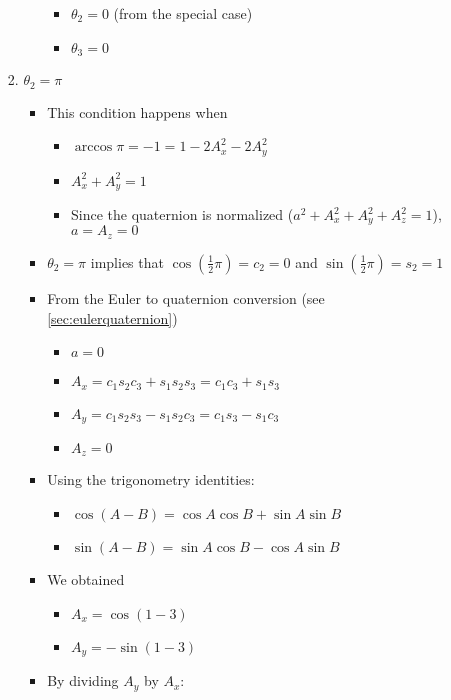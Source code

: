 \documentclass[letterpaper]{article}
\begin{document}
\begin{itemize}
\begin{itemize}
\begin{enumerate}
\begin{itemize}
\begin{itemize}
										\item $\theta_2 = 0$ (from the special case)
										\item $\theta_3 = 0$
									\end{itemize}
							\end{itemize}
						\item $\theta_2 = \pi$
							\begin{itemize}
								\item This condition happens when
									\begin{itemize}
										\item $\arccos{\pi} = -1 = 1 - 2A_x^2 - 2A_y^2$
										\item $A_x^2 + A_y^2 = 1$
										\item Since the quaternion is normalized ($a^2 + A_x^2 + A_y^2 + A_z^2 = 1$), $a = A_z = 0$
									\end{itemize}
								\item $\theta_2 = \pi$ implies that $\cos{\left(\frac{1}{2} \pi\right)} = c_2 = 0$ and $\sin{\left(\frac{1}{2} \pi\right)} = s_2 = 1$
								\item From the Euler to quaternion conversion (see \ref{sec:eulerquaternion})
									\begin{itemize}
										\item $a = 0$
										\item $A_x = c_1s_2c_3 + s_1s_2s_3 = c_1c_3 + s_1s_3$
										\item $A_y = c_1s_2s_3 - s_1s_2c_3 = c_1s_3 - s_1c_3$
										\item $A_z = 0$
									\end{itemize}
								\item Using the trigonometry identities:
									\begin{itemize}
										\item $\cos{\left(A-B\right)} = \cos{A}\cos{B} + \sin{A}\sin{B}$
										\item $\sin{\left(A-B\right)} = \sin{A}\cos{B} - \cos{A}\sin{B}$
									\end{itemize}
								\item We obtained
									\begin{itemize}
										\item $A_x = \cos{\left(1-3\right)}$
										\item $A_y = -\sin{\left(1-3\right)}$
									\end{itemize}
								\item By dividing $A_y$ by $A_x$:

\end{itemize}
\end{enumerate}
\end{itemize}
\end{itemize}
\end{document}
